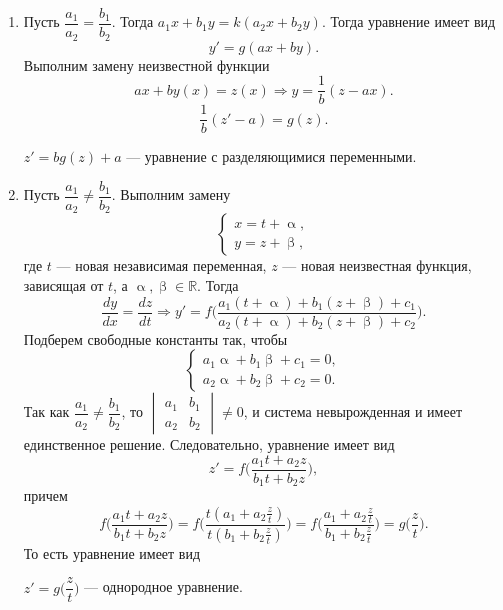 \documentclass[a4paper, 12pt]{report}
\newcommand{\Rm}{\mathbb{R}}
\renewcommand{\alpha}{\upalpha}
\renewcommand{\beta}{\upbeta}
\begin{document}
\begin{enumerate}
	\item Пусть $\dfrac{a_1}{a_2} = \dfrac{b_1}{b_2}$. Тогда $a_1x + b_1y = k(a_2x + b_2y)$. Тогда уравнение имеет вид $$y' = g(ax + by).$$
	Выполним замену неизвестной функции $$ax + by(x) = z(x)\Rightarrow y = \dfrac{1}{b}(z-ax).$$
	$$\dfrac{1}{b}(z' - a) = g(z).$$
	\begin{center}
		$ z' = bg(z) + a$ --- уравнение с разделяющимися переменными.
	\end{center}
\item Пусть $\dfrac{a_1}{a_2}\ne \dfrac{b_1}{b_2}$. Выполним замену $$\begin{cases}
	x = t + \alpha,\\
	y = z + \beta,
\end{cases}$$
где $t$ --- новая независимая переменная, $z$ --- новая неизвестная функция, зависящая от $t$, а $\alpha,\beta \in \Rm$. Тогда $$\dfrac{dy}{dx} = \dfrac{dz}{dt}\Rightarrow y' = f\Big(\dfrac{a_1(t+\alpha) + b_1(z+\beta) + c_1}{a_2(t+\alpha) + b_2(z+\beta) + c_2}\Big).$$
Подберем свободные константы так, чтобы $$\begin{cases}
	a_1\alpha + b_1\beta + c_1 = 0,\\
	a_2\alpha + b_2\beta + c_2 = 0.
\end{cases}$$
Так как $\dfrac{a_1}{a_2}\ne \dfrac{b_1}{b_2}$, то $\begin{vmatrix}
	a_1&b_1\\
	a_2&b_2
\end{vmatrix}\ne 0$, и система невырожденная и имеет единственное решение. Следовательно, уравнение имеет вид $$z' = f\Big(\dfrac{a_1 t + a_2 z}{b_1 t + b_2 z}\Big),$$
причем $$f\Big(\dfrac{a_1 t + a_2 z}{b_1 t + b_2 z}\Big) = f\Big(\dfrac{t(a_1  + a_2 \frac{z}{t})}{t(b_1  + b_2 \frac{z}{t})}\Big) = f\Big(\dfrac{a_1  + a_2 \frac{z}{t}}{b_1  + b_2 \frac{z}{t}}\Big) = g\Big(\dfrac{z}{t}\Big).$$
То есть уравнение имеет вид \begin{center}
	$z' = g\Big(\dfrac{z}{t}\Big)$ --- однородное уравнение.
\end{center}
\end{enumerate}
\end{document}
